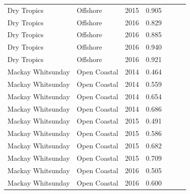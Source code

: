 \begin{longtable}{llccccc}
  Dry Tropics & Offshore & 2015 & 0.905 & \cellcolor[HTML]{00734D}{A} & \cellcolor[HTML]{00734D}{A} & \cellcolor[HTML]{00734D}{A} \\ 
  Dry Tropics & Offshore & 2016 & 0.829 & \cellcolor[HTML]{B0D235}{B} & \cellcolor[HTML]{00734D}{A} & \cellcolor[HTML]{B0D235}{B} \\ 
  Dry Tropics & Offshore & 2016 & 0.885 & \cellcolor[HTML]{00734D}{A} & \cellcolor[HTML]{00734D}{A} & \cellcolor[HTML]{00734D}{A} \\ 
  Dry Tropics & Offshore & 2016 & 0.940 & \cellcolor[HTML]{00734D}{A} & \cellcolor[HTML]{00734D}{A} & \cellcolor[HTML]{00734D}{A} \\ 
  Dry Tropics & Offshore & 2016 & 0.921 & \cellcolor[HTML]{00734D}{A} & \cellcolor[HTML]{00734D}{A} & \cellcolor[HTML]{00734D}{A} \\ 
  Mackay Whitsunday & Open Coastal & 2014 & 0.464 & \cellcolor[HTML]{F47721}{D} & \cellcolor[HTML]{F0C918}{C} & \cellcolor[HTML]{F47721}{D} \\ 
  Mackay Whitsunday & Open Coastal & 2014 & 0.559 & \cellcolor[HTML]{F0C918}{C} & \cellcolor[HTML]{F0C918}{C} & \cellcolor[HTML]{F0C918}{C} \\ 
  Mackay Whitsunday & Open Coastal & 2014 & 0.654 & \cellcolor[HTML]{F0C918}{C} & \cellcolor[HTML]{B0D235}{B} & \cellcolor[HTML]{B0D235}{B} \\ 
  Mackay Whitsunday & Open Coastal & 2014 & 0.686 & \cellcolor[HTML]{B0D235}{B} & \cellcolor[HTML]{B0D235}{B} & \cellcolor[HTML]{B0D235}{B} \\ 
  Mackay Whitsunday & Open Coastal & 2015 & 0.491 & \cellcolor[HTML]{F47721}{D} & \cellcolor[HTML]{F0C918}{C} & \cellcolor[HTML]{F47721}{D} \\ 
  Mackay Whitsunday & Open Coastal & 2015 & 0.586 & \cellcolor[HTML]{F0C918}{C} & \cellcolor[HTML]{F0C918}{C} & \cellcolor[HTML]{F0C918}{C} \\ 
  Mackay Whitsunday & Open Coastal & 2015 & 0.682 & \cellcolor[HTML]{B0D235}{B} & \cellcolor[HTML]{B0D235}{B} & \cellcolor[HTML]{B0D235}{B} \\ 
  Mackay Whitsunday & Open Coastal & 2015 & 0.709 & \cellcolor[HTML]{B0D235}{B} & \cellcolor[HTML]{B0D235}{B} & \cellcolor[HTML]{B0D235}{B} \\ 
  Mackay Whitsunday & Open Coastal & 2016 & 0.505 & \cellcolor[HTML]{F0C918}{C} & \cellcolor[HTML]{F0C918}{C} & \cellcolor[HTML]{F0C918}{C} \\ 
  Mackay Whitsunday & Open Coastal & 2016 & 0.600 & \cellcolor[HTML]{F0C918}{C} & \cellcolor[HTML]{B0D235}{B} & \cellcolor[HTML]{F0C918}{C} \\ 

\end{longtable}

